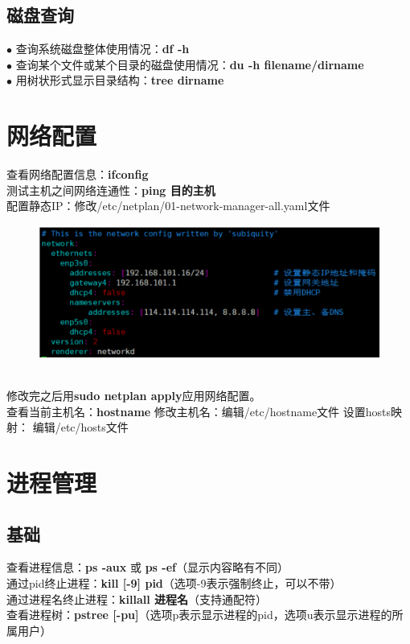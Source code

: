 \documentclass[11pt]{article}
\begin{document}
\subsection{磁盘查询}
$\bullet$ 查询系统磁盘整体使用情况：\textbf{df -h}  \\
$\bullet$ 查询某个文件或某个目录的磁盘使用情况：\textbf{du -h filename/dirname}  \\
$\bullet$ 用树状形式显示目录结构：\textbf{tree dirname}

\section{网络配置}
查看网络配置信息：\textbf{ifconfig} \\
测试主机之间网络连通性：\textbf{ping 目的主机} \\
配置静态IP：修改/etc/netplan/01-network-manager-all.yaml文件 \\
\begin{figure}[htb]
    \centering
    \includegraphics[scale=0.27]{imgs/static_ip.png}
\end{figure} \\
修改完之后用\textbf{sudo netplan apply}应用网络配置。 \\
查看当前主机名：\textbf{hostname} \qquad 修改主机名：编辑/etc/hostname文件 \qquad 设置hosts映射：
编辑/etc/hosts文件

\section{进程管理}
\subsection{基础}
查看进程信息：\textbf{ps -aux} 或 \textbf{ps -ef}（显示内容略有不同）  \\
通过pid终止进程：\textbf{kill [-9] pid}（选项-9表示强制终止，可以不带） \\
通过进程名终止进程：\textbf{killall 进程名}（支持通配符） \\
查看进程树：\textbf{pstree [-pu]}（选项p表示显示进程的pid，选项u表示显示进程的所属用户）
\end{document}
